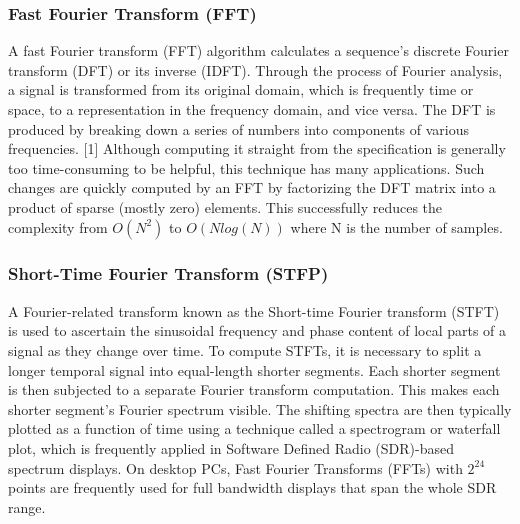 \subsubsection{Fast Fourier Transform (FFT)}
A fast Fourier transform (FFT) algorithm calculates a sequence's discrete Fourier transform (DFT) or its inverse (IDFT). Through the process of Fourier analysis, a signal is transformed from its original domain, which is frequently time or space, to a representation in the frequency domain, and vice versa. The DFT is produced by breaking down a series of numbers into components of various frequencies. [1] Although computing it straight from the specification is generally too time-consuming to be helpful, this technique has many applications. Such changes are quickly computed by an FFT by factorizing the DFT matrix into a product of sparse (mostly zero) elements.\cite{fft} This successfully reduces the complexity from    $O(N^2)$ to  $O(Nlog(N))$ where N is the number of samples.

\subsubsection{Short-Time Fourier Transform (STFP)}
A Fourier-related transform known as the Short-time Fourier transform (STFT) is used to ascertain the sinusoidal frequency and phase content of local parts of a signal as they change over time. To compute STFTs, it is necessary to split a longer temporal signal into equal-length shorter segments. Each shorter segment is then subjected to a separate Fourier transform computation. This makes each shorter segment's Fourier spectrum visible. The shifting spectra are then typically plotted as a function of time using a technique called a spectrogram or waterfall plot, which is frequently applied in Software Defined Radio (SDR)-based spectrum displays. On desktop PCs, Fast Fourier Transforms (FFTs) with $2^{24}$ points are frequently used for full bandwidth displays that span the whole SDR range.\cite{stft}

